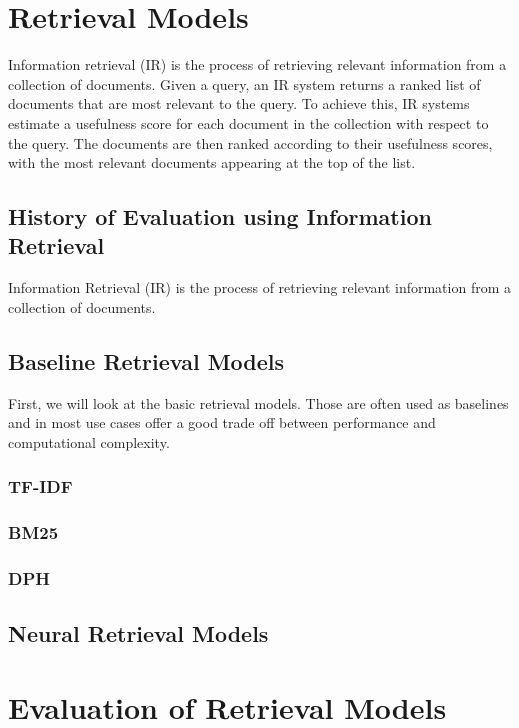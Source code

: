 \section{Retrieval Models}\label{retrieval-models}
Information retrieval (IR) is the process of retrieving relevant information from a collection of documents.
Given a query, an IR system returns a ranked list of documents that are most relevant to the query.
To achieve this, IR systems estimate a usefulness score for each document in the collection with respect to the query.
The documents are then ranked according to their usefulness scores, with the most relevant documents appearing at the top of the list.

\subsection{History of Evaluation using Information Retrieval}\label{history-of-evaluation-using-information-retrieval}
Information Retrieval (IR) is the process of retrieving relevant information from a collection of documents.


\subsection{Baseline Retrieval Models}\label{baseline-retrieval-models}
First, we will look at the basic retrieval models.
Those are often used as baselines and in most use cases offer a good trade off between performance and computational complexity.

\subsubsection{TF-IDF}\label{tf-idf}
\subsubsection{BM25}\label{bm25}
\subsubsection{DPH}\label{dph}

\subsection{Neural Retrieval Models}\label{neural-retrieval-models}

\section{Evaluation of Retrieval Models}\label{evaluation-of-retrieval-models}